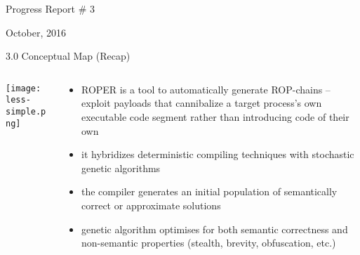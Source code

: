 \documentclass[9pt]{beamer}
\begin{document}



\begin{frame}
\begin{center}    
    {\huge Progress Report \# 3}
    \vspace{.3cm}
    
    {\large October, 2016}
    \end{center} 
    
\end{frame}

\begin{frame}{3.0 Conceptual Map (Recap)}

\begin{columns}

\begin{column}{0.5\textwidth}
\texttt{[image: less-simple.png]}

\end{column}
\begin{column}{.5\textwidth}

\begin{itemize}
\item ROPER is a tool to automatically generate ROP-chains -- exploit payloads that cannibalize a target process's own executable code segment rather than introducing code of their own
\item it hybridizes deterministic compiling techniques with stochastic genetic algorithms
\item the compiler generates an initial population of semantically correct or approximate solutions
\item genetic algorithm optimises for both semantic correctness and non-semantic properties (stealth, brevity, obfuscation, etc.)
\end{itemize}

\end{column}

\end{columns}

\end{frame}
\end{document}
